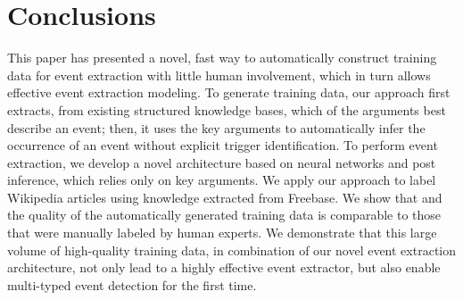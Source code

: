 \section{Conclusions}
This paper has presented a novel, fast way to automatically construct training data for event extraction with little human involvement,
which in turn allows effective event extraction modeling. To generate training data, our approach first extracts, from existing structured
knowledge bases, which of the arguments best describe an event; then, it uses the key arguments to automatically infer the occurrence of an
event without explicit trigger identification. To perform event extraction, we develop a novel architecture based on neural networks and
post inference, which relies only on key arguments. We apply our approach to label Wikipedia articles using knowledge extracted from
Freebase. We show that and the quality of the automatically generated training data is comparable to those that were manually labeled by
human experts.  We demonstrate that this large volume of high-quality training data, in combination of our novel event extraction
architecture, not only lead to a highly effective event extractor, but also enable multi-typed event detection for the first time.




%

